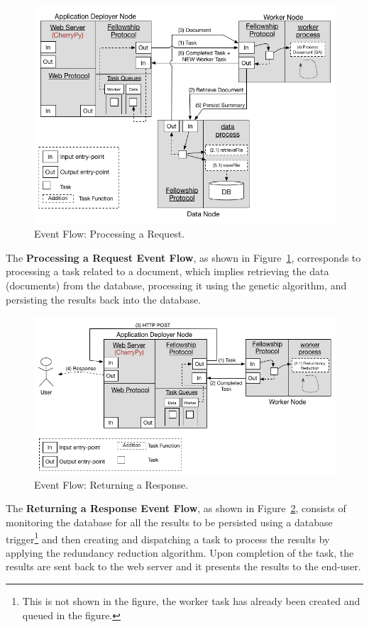 \documentclass[12pt, titlepage]{uo_temp}
\begin{document}
     \begin{figure}[h!]
       \centering
       \includegraphics[width=125mm]{images/ef2.png}
       \caption{Event Flow: Processing a Request.}
       \label{ef2}
     \end{figure}

     The \textbf{Processing a Request Event Flow}, as shown in Figure~\ref{ef2},
     corresponds to processing a task related to a document, which implies retrieving the data
     (documents) from the database, processing it using the genetic algorithm, and persisting
     the results back into the database.

     \begin{figure}[h!]
       \centering
       \includegraphics[width=125mm]{images/ef3.png}
       \caption{Event Flow: Returning a Response.}
       \label{ef3}
     \end{figure}

     The \textbf{Returning a Response Event Flow}, as shown in Figure~\ref{ef3}, consists
     of monitoring the database for all the results to be persisted using a database
     trigger\footnote{This is not shown in the figure, the worker task has already been
       created and queued in the figure.} and then creating and dispatching a task to
     process the results by applying the redundancy reduction algorithm. Upon completion
     of the task, the results are sent back to the web server and it presents the results
     to the end-user.
\end{document}
